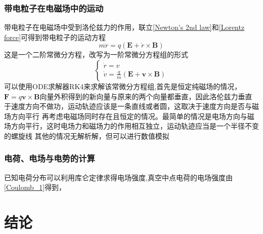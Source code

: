 \documentclass[UTF8,a4paper,10pt]{ctexart}
\begin{document}
\begin{multicols}{2}
            \subsubsection{带电粒子在电磁场中的运动}
            带电粒子在电磁场中受到洛伦兹力的作用，联立\eqref{Newton's 2nd law}和\eqref{Lorentz force}可得到带电粒子的运动方程
            \begin{equation}
                m\ddot{r} = q(\bm{E} + \dot{r}\times \bm{B})
            \end{equation}
            这是一个二阶常微分方程，改写为一阶常微分方程组的形式
            \begin{equation}
                \left\{\begin{array}{l}
                    \dot{r} = v\\
                    \dot{v} = \frac{q}{m}(\bm{E} + \bm{v}\times \bm{B})
                \end{array}\right.
            \end{equation}
            可以使用ODE求解器RK4来求解该常微分方程组,首先是恒定纯磁场的情况，$\bm{F} = q\bm{v}\times\bm{B}$向量外积得到的新向量与原来的两个向量都垂直，因此洛伦兹力垂直于速度方向不做功，运动轨迹应该是一条直线或者圆，这取决于速度方向是否与磁场方向平行
            再考虑电磁场同时存在且恒定的情况。最简单的情况是电场方向与磁场方向平行，这时电场力和磁场力的作用相互独立，运动轨迹应当是一个半径不变的螺旋线
            其他的情况无解析解，但可以进行数值模拟
            \subsubsection{电荷、电场与电势的计算}
            已知电荷分布可以利用库仑定律求得电场强度,真空中点电荷的电场强度由\eqref{Coulomb_1}得到，
    \section{结论}
\end{multicols}
\end{document}
